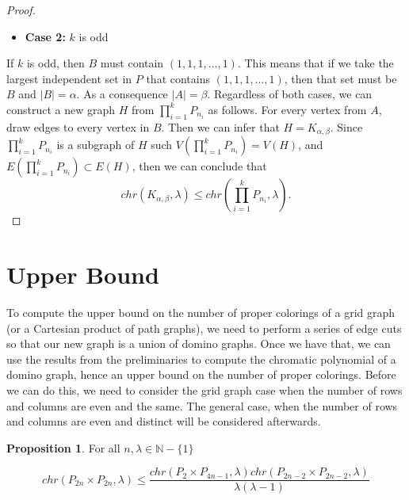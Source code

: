 \documentclass[11pt]{article}
\theoremstyle{definition}
\newcommand{\N}{{\mathbb{N}}}
\newtheorem{prop}{Proposition}
\begin{document}
\begin{proof}
\begin{itemize}
\item \textbf{Case 2: }$k$ is odd
\end{itemize}If $k$ is odd, then $B$ must contain $(1, 1, 1,\ldots, 1)$. This means that if we take the largest independent set in $P$ that contains $(1, 1, 1,\ldots, 1)$, then that set must be $B$ and $|B| = \alpha$. As a consequence $|A| = \beta$.
\newline
\newline \indent
Regardless of both cases, we can construct a new graph $H$ from $\prod_{i = 1}^{k}P_{n_{i}}$ as follows. For every vertex from $A$, draw edges to every vertex in $B$. Then we can infer that $H = K_{\alpha, \beta}$. Since $\prod_{i = 1}^{k}P_{n_{i}}$ is a subgraph of $H$ such $V(\prod_{i = 1}^{k}P_{n_{i}}) = V(H)$, and $E(\prod_{i = 1}^{k}P_{n_{i}}) \subset E(H)$, then we can conclude that 
\begin{equation}
chr(K_{\alpha, \beta}, \lambda) \leq chr(\prod_{i = 1}^{k}P_{n_{i}}, \lambda). \nonumber
\end{equation}
\end{proof}

\section{Upper Bound}
\label{sec:Upper Bound}

To compute the upper bound on the number of proper colorings of a grid graph (or a Cartesian product of path graphs), we need to perform a series of edge cuts so that our new graph is a union of domino graphs. Once we have that, we can use the results from the preliminaries to compute the chromatic polynomial of a domino graph, hence an upper bound on the number of proper colorings. Before we can do this, we need to consider the grid graph case when the number of rows and columns are even and the same. The general case, when the number of rows and columns are even and distinct will be considered afterwards.

\begin{prop}
For all $n,\lambda \in \N - \{1\}$

\begin{equation}
chr(P_{2n} \times P_{2n}, \lambda) \leq \frac{chr(P_{2} \times P_{4n - 1},\lambda)chr(P_{2n - 2} \times P_{2n - 2}, \lambda)}{\lambda(\lambda - 1)}
\end{equation}
\end{prop}
\end{document}

